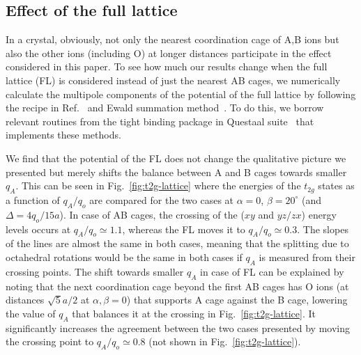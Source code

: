 \documentclass[a4paper,prb,twocolumn]{revtex4-1}  %
\newcommand{\com}[1]{}
\newcommand{\az}[1]{{\color{magenta}{#1}}} %
\begin{document}
\subsection{Effect of the full lattice}
\label{sec:FL}

In a crystal, obviously, not only the nearest coordination cage of A,B ions but also
 the other ions (including O) at longer distances
  participate in the effect considered in this paper.
To see how much our results change when 
 the full lattice (FL) is considered instead of just the nearest AB cages,
we numerically calculate the multipole components of the potential
 of the full lattice by following the recipe in Ref.~\cite{FinnisPRL98,PaxtonPRB08,PaxtonNotes}
and Ewald summation method~\cite{Ewald1921}.
To do this, 
we borrow relevant routines from the tight binding package in Questaal suite~\cite{Questaal} that implements these methods.


\com{First,
FL does not preserve the cubic symmetry of the potential and the degeneracy of the t2g manifold 
is slightly lifted at zero rotations, i.e., for a cubic structure.
However, it is insignificant and we will not discuss it further.
What's more important is that the
potential of the full lattice does not change the qualitative picture we resented
but merely shifts the balance between A and B cages towards smaller $q_A$.
}

We find that the
potential of the FL does not change the qualitative picture we presented
but merely shifts the balance between A and B cages towards smaller $q_A$.
This can be seen in Fig.~\ref{fig:t2g-lattice}
where the energies of the $t_{2g}$ states as a function of $q_A/q_o$
are compared for the two cases
at $\alpha=0$, $\beta=20^\circ$ (and $\Delta=4q_o/15a$).
In case of AB cages, the crossing of the 
($xy$ and $yz/zx$)
energy levels occurs 
at $q_A/q_o\simeq1.1$,
whereas the FL moves it to $q_A/q_o\simeq0.3$.
The slopes of the lines are almost the same in both cases,
meaning that the splitting due to octahedral rotations 
would be the same in both cases if $q_A$ is measured 
from their crossing points.
The shift towards smaller $q_A$ in case of FL
can be explained by noting that
the next coordination cage beyond the first AB cages
has O ions
(at distances $\sqrt{5}a/2$ at $\alpha,\beta=0$) %
that supports A cage
against the B cage, lowering the value of $q_A$ that balances it
at the crossing in Fig.~\ref{fig:t2g-lattice}.
It significantly increases the agreement between the two cases presented
by moving the crossing point 
to $q_A/q_o\simeq0.8$ (not shown in Fig.~\ref{fig:t2g-lattice}).
\end{document}
